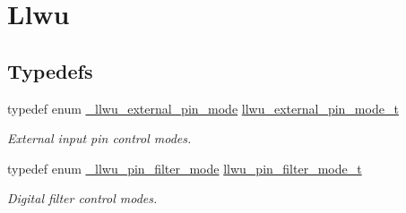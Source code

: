 \hypertarget{group__llwu}{}\section{Llwu}
\label{group__llwu}
\subsection*{Typedefs}
\begin{DoxyCompactItemize}
\item 
\mbox{\label{group__llwu_gad50bd170037210be2164aa78bdde2621}} 
typedef enum \mbox{\hyperlink{group__llwu_ga5b7fb066930b9abddc4de2d5431f1f46}{\+\_\+llwu\+\_\+external\+\_\+pin\+\_\+mode}} \mbox{\hyperlink{group__llwu_gad50bd170037210be2164aa78bdde2621}{llwu\+\_\+external\+\_\+pin\+\_\+mode\+\_\+t}}
\begin{DoxyCompactList}\small\item\em External input pin control modes. \end{DoxyCompactList}\item 
\mbox{\label{group__llwu_ga4a6b294b46f6b4d70cee513423be8d0c}} 
typedef enum \mbox{\hyperlink{group__llwu_ga04b013885364b1fc2c1e9d90e25ef067}{\+\_\+llwu\+\_\+pin\+\_\+filter\+\_\+mode}} \mbox{\hyperlink{group__llwu_ga4a6b294b46f6b4d70cee513423be8d0c}{llwu\+\_\+pin\+\_\+filter\+\_\+mode\+\_\+t}}
\begin{DoxyCompactList}\small\item\em Digital filter control modes. \end{DoxyCompactList}\end{DoxyCompactItemize}
